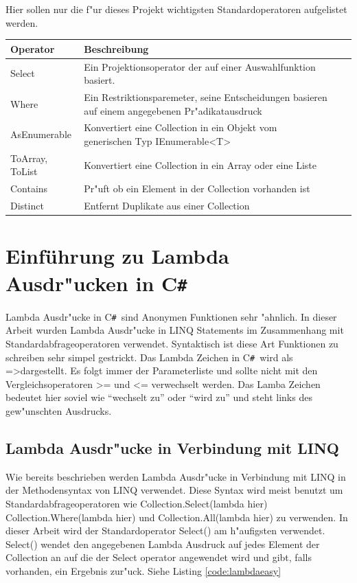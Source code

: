 \documentclass[pagesize, paper=a4, fontsize=12pt,titlepage=true, headings=small, headnosepline, abstractoff, liststotoc, nochapterprefix, plainheadsepline]{scrreprt}
\newcommand{\CS}{C\texttt{\#}}
\newcommand{\CSS}{C\texttt{\# }}
\newcommand{\LAM}{ =\textgreater\space}
\begin{document}
Hier sollen nur die f"ur dieses Projekt wichtigsten Standardoperatoren aufgelistet werden.
\newline

\label{tab:standardoperatoren}
\begin{tabular}{p{3cm}|p{9cm} |l|l|}
\hline
  Operator & Beschreibung\\
\hline
\hline
  Select & Ein Projektionsoperator der auf einer Auswahlfunktion basiert.\\
\hline
  Where & Ein Restriktionsparemeter, seine Entscheidungen basieren auf einem angegebenen
 Pr"adikatausdruck\\
\hline
AsEnumerable & Konvertiert eine Collection in ein Objekt vom generischen Typ IEnumerable<T>\\
\hline
ToArray, ToList & Konvertiert eine Collection in ein Array oder eine Liste\\
\hline
Contains & Pr"uft ob ein Element in der Collection vorhanden ist\\
\hline
Distinct & Entfernt Duplikate aus einer Collection \\
\hline
\end{tabular}

\newpage
	\section {Einführung zu Lambda Ausdr"ucken in \CS}
		Lambda Ausdr"ucke in \CSS sind Anonymen Funktionen sehr "ahnlich. In dieser Arbeit wurden Lambda Ausdr"ucke in LINQ Statements im Zusammenhang mit Standardabfrageoperatoren verwendet. Syntaktisch ist diese Art Funktionen zu schreiben sehr simpel gestrickt. Das Lambda Zeichen in \CSS wird als \LAM dargestellt. Es folgt immer der Parameterliste und sollte nicht mit den Vergleichsoperatoren \textgreater = und \textless = verwechselt werden. Das Lamba Zeichen bedeutet hier soviel wie "`wechselt zu"' oder "`wird zu"' und steht links des gew"unschten Ausdrucks.
		\subsection {Lambda Ausdr"ucke in Verbindung mit LINQ}
Wie bereits beschrieben werden Lambda Ausdr"ucke  in Verbindung mit LINQ in der Methodensyntax von LINQ verwendet. Diese Syntax wird meist benutzt um Standardabfrageoperatoren wie Collection.Select(lambda hier) Collection.Where(lambda hier) und Collection.All(lambda hier) zu verwenden. In dieser Arbeit wird der Standardoperator Select() am h"aufigsten verwendet. Select() wendet den angegebenen Lambda Ausdruck auf jedes Element der Collection an auf die der Select operator angewendet wird und gibt, falls vorhanden, ein Ergebnis zur"uck. Siehe Listing \ref{code:lambdaeasy}
\end{document}
